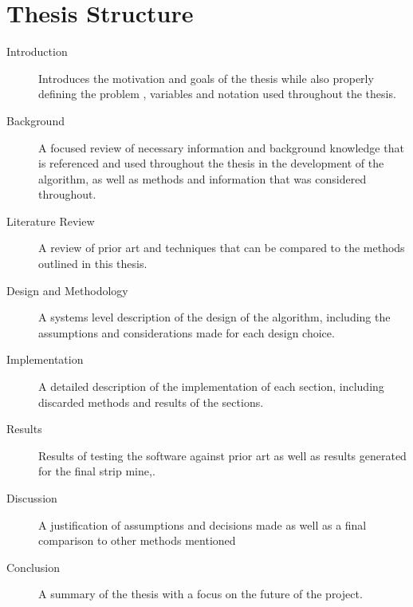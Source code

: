 \section{Thesis Structure}
\begin{description}
    \item[Introduction] Introduces the motivation and goals of the thesis while also properly defining the problem , variables and notation used throughout the thesis.
    \item[Background] A focused review of necessary information and background knowledge that is referenced and used throughout the thesis in the development of the algorithm, as well as methods and information that was considered throughout. 
    \item[Literature Review] A review of prior art and techniques that can be compared to the methods outlined in this thesis.
    \item[Design and Methodology] A systems level description of the design of the algorithm, including the assumptions and considerations made for each design choice.
    \item[Implementation] A detailed description of the implementation of each section, including discarded methods and results of the sections.
    \item[Results] Results of testing the software against prior art as well as results generated for the final strip mine,.
    \item[Discussion] A justification of assumptions and decisions made as well as a final comparison to other methods mentioned 
    \item[Conclusion] A summary of the thesis with a focus on the future of the project. 
\end{description}